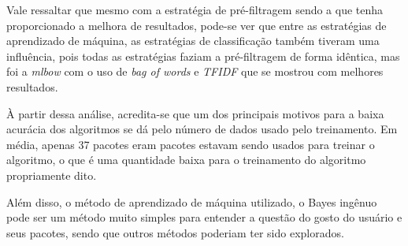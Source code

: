 Vale ressaltar que mesmo com a estratégia de pré-filtragem sendo a que tenha
proporcionado a melhora de resultados, pode-se ver que entre as estratégias de
aprendizado de máquina, as estratégias de classificação também tiveram uma
influência, pois todas as estratégias faziam a pré-filtragem de forma idêntica,
mas foi a \textit{mlbow} com o uso de \textit{bag of words} e \textit{TFIDF} que
se mostrou com melhores resultados.

À partir dessa análise, acredita-se que um dos principais motivos para a baixa acurácia dos algoritmos
se dá pelo número de dados usado pelo treinamento. Em média, apenas 37 pacotes
eram pacotes estavam sendo usados para treinar o algoritmo, o que é uma
quantidade baixa para o treinamento do algoritmo propriamente dito.

Além disso, o método de aprendizado de máquina utilizado, o Bayes ingênuo pode
ser um método muito simples para entender a questão do gosto do usuário e seus
pacotes, sendo que outros métodos poderiam ter sido explorados.
